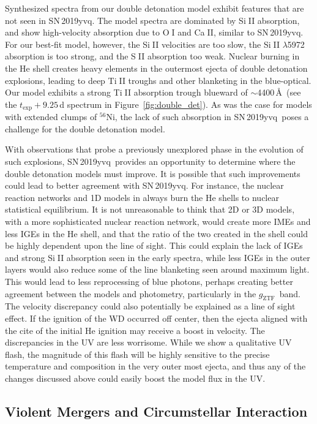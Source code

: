 \documentclass[twocolumn]{aastex63}
\def\ion#1#2{#1$\;${\footnotesize\rm{#2}}\relax}
\newcommand{\gztf}{$g_\mathrm{ZTF}$}
\newcommand{\radni}{$^{56}$Ni}
\newcommand{\sn}{SN\,2019yvq}
\begin{document}
Synthesized spectra from our double detonation model exhibit features that are
not seen in \sn. The model spectra are dominated by \ion{Si}{II} absorption,
and show high-velocity absorption due to \ion{O}{I} and \ion{Ca}{II}, similar
to \sn. For our best-fit model, however, the \ion{Si}{II} velocities are too
slow, the \ion{Si}{II} $\lambda$5972 absorption is too strong, and the
\ion{S}{II} absorption too weak. Nuclear burning in the He shell creates heavy
elements in the outermost ejecta of double detonation explosions, leading to
deep \ion{Ti}{II} troughs and other blanketing in the blue-optical. Our model
exhibits a strong \ion{Ti}{II} absorption trough blueward of $\sim$4400\,\AA\
(see the $t_\mathrm{exp} + 9.25$\,d spectrum in Figure~\ref{fig:double_det}).
As was the case for models with extended clumps of \radni, the lack of such
absorption in \sn\ poses a challenge for the double detonation model.

With observations that probe a previously unexplored phase in the evolution of
such explosions, \sn\ provides an opportunity to determine where the double
detonation models must improve. It is possible that such improvements could
lead to better agreement with \sn. For instance, the nuclear reaction networks
and 1D models in \citet{Polin19} always burn the He shells to nuclear
statistical equilibrium. It is not unreasonable to think that 2D or 3D models,
with a more sophisticated nuclear reaction network, would create more IMEs and
less IGEs in the He shell, and that the ratio of the two created in the shell
could be highly dependent upon the line of sight. This could explain the lack
of IGEs and strong \ion{Si}{II} absorption seen in the early spectra, while
less IGEs in the outer layers would also reduce some of the line blanketing
seen around maximum light. This would lead to less reprocessing of blue
photons, perhaps creating better agreement between the models and photometry,
particularly in the \gztf\ band. The velocity discrepancy could also
potentially be explained as a line of sight effect. If the ignition of the WD
occurred off center, then the ejecta aligned with the cite of the initial He
ignition may receive a boost in velocity. The discrepancies in the UV are less
worrisome. While we show a qualitative UV flash, the magnitude of this flash
will be highly sensitive to the precise temperature and composition in the
very outer most ejecta, and thus any of the changes discussed above could
easily boost the model flux in the UV.

\subsection{Violent Mergers and Circumstellar
Interaction}\label{sec:merger_csm}
\end{document}

